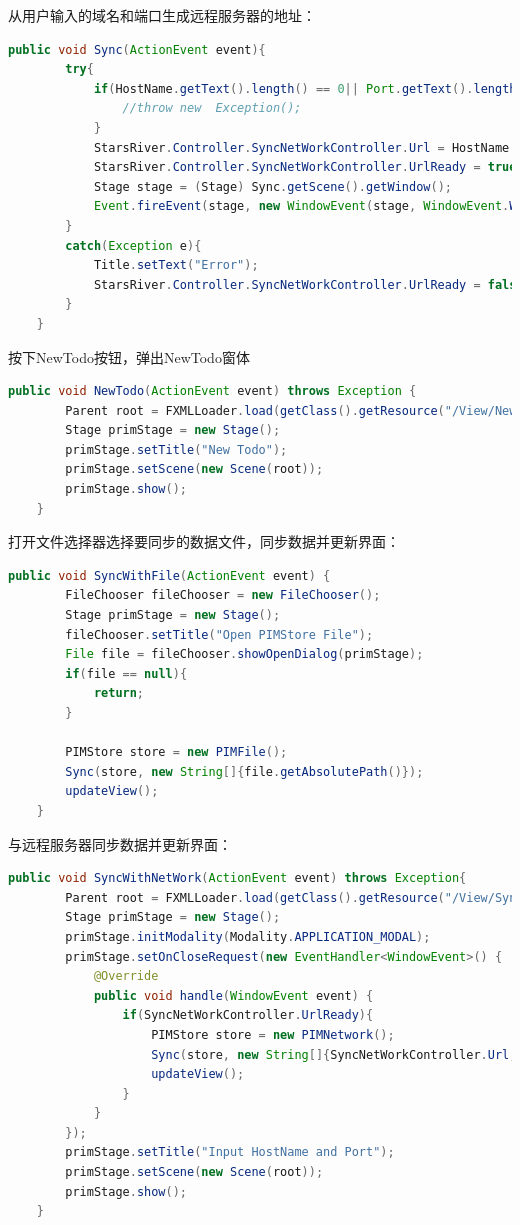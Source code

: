 \documentclass[a4paper]{article}
\begin{document}
    从用户输入的域名和端口生成远程服务器的地址：
    \begin{lstlisting}[language=Java]
    public void Sync(ActionEvent event){
        try{
            if(HostName.getText().length() == 0|| Port.getText().length() == 0){
                //throw new  Exception();
            }
            StarsRiver.Controller.SyncNetWorkController.Url = HostName.getText() + ":" + Port.getText();
            StarsRiver.Controller.SyncNetWorkController.UrlReady = true;
            Stage stage = (Stage) Sync.getScene().getWindow();
            Event.fireEvent(stage, new WindowEvent(stage, WindowEvent.WINDOW_CLOSE_REQUEST ));
        }
        catch(Exception e){
            Title.setText("Error");
            StarsRiver.Controller.SyncNetWorkController.UrlReady = false;
        }
    }
    \end{lstlisting}


    按下NewTodo按钮，弹出NewTodo窗体
    \begin{lstlisting}[language=Java]
    public void NewTodo(ActionEvent event) throws Exception {
        Parent root = FXMLLoader.load(getClass().getResource("/View/NewTodo.fxml"));
        Stage primStage = new Stage();
        primStage.setTitle("New Todo");
        primStage.setScene(new Scene(root));
        primStage.show();
    }
    \end{lstlisting}


    打开文件选择器选择要同步的数据文件，同步数据并更新界面：
    \begin{lstlisting}[language=Java]
    public void SyncWithFile(ActionEvent event) {
        FileChooser fileChooser = new FileChooser();
        Stage primStage = new Stage();
        fileChooser.setTitle("Open PIMStore File");
        File file = fileChooser.showOpenDialog(primStage);
        if(file == null){
            return;
        }

        PIMStore store = new PIMFile();
        Sync(store, new String[]{file.getAbsolutePath()});
        updateView();
    }
    \end{lstlisting}

    与远程服务器同步数据并更新界面：
    \begin{lstlisting}[language=Java]
    public void SyncWithNetWork(ActionEvent event) throws Exception{
        Parent root = FXMLLoader.load(getClass().getResource("/View/SyncNetWork.fxml"));
        Stage primStage = new Stage();
        primStage.initModality(Modality.APPLICATION_MODAL);
        primStage.setOnCloseRequest(new EventHandler<WindowEvent>() {
            @Override
            public void handle(WindowEvent event) {
                if(SyncNetWorkController.UrlReady){
                    PIMStore store = new PIMNetwork();
                    Sync(store, new String[]{SyncNetWorkController.Url,"post"});
                    updateView();
                }
            }
        });
        primStage.setTitle("Input HostName and Port");
        primStage.setScene(new Scene(root));
        primStage.show();
    }
    \end{lstlisting}
\end{document}
